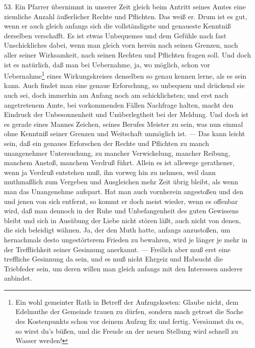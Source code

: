 53. Ein Pfarrer übernimmt in unserer Zeit gleich beim Antritt seines Amtes eine ziemliche Anzahl äußerlicher Rechte und Pflichten. Das weiß er. Drum ist es gut, wenn er auch gleich anfangs sich die vollständigste und genaueste Kenntniß derselben verschafft. Es ist etwas Unbequemes und dem Gefühle nach fast Unschickliches dabei, wenn man gleich vorn herein nach seinen Grenzen, nach aller seiner Wirksamkeit, nach seinen Rechten und Pflichten fragen soll. Und doch ist es natürlich, daß man bei
Uebernahme, ja, wo möglich, schon vor Uebernahme\footnote{Ein wohl gemeinter Rath in Betreff der Aufzugskosten: Glaube nicht, dem Edelmuthe der Gemeinde trauen zu dürfen, sondern mach getrost die Sache des Kostenpunkts schon vor deinem Aufzug fix und fertig. Versäumst du es, so wirst du’s büßen, und die Freude an der neuen Stellung wird schnell zu Wasser werden!} eines Wirkungskreises denselben so genau kennen lerne, als es sein kann. Auch findet man eine genaue Erforschung, so unbequem und drückend sie auch sei, doch immerhin am Anfang noch am schicklichsten; und erst nach angetretenem Amte, bei vorkommenden Fällen Nachfrage halten, macht den Eindruck der Unbesonnenheit und Unüberlegtheit bei der Meldung. Und doch ist es gerade eines Mannes Zeichen, seines Berufes Meister zu sein, was nun einmal ohne Kenntniß seiner Grenzen und Weitschaft unmöglich ist. — Das kann leicht sein, daß ein genaues Erforschen der Rechte und Pflichten zu manch unangenehmer Untersuchung, zu mancher Verwickelung, mancher Reibung, manchem Anstoß, manchem Verdruß führt. Allein es ist allewege gerathener, wenn ja Verdruß entstehen muß, ihn vorweg hin zu nehmen, weil dann muthmaßlich zum Vergeben und Ausgleichen mehr Zeit übrig bleibt, als wenn man das Unangenehme aufspart. Hat man auch vornherein angestoßen und den und jenen von sich entfernt, so kommt er doch meist wieder, wenn es offenbar wird, daß man dennoch in der Ruhe und Unbefangenheit des guten Gewissens bleibt und sich in Ausübung der Liebe nicht stören läßt, auch nicht von denen, die sich beleidigt wähnen. Ja, der den Muth hatte, anfangs anzustoßen, um hernachmals
desto ungestörterem Frieden zu bewahren, wird je länger je mehr in der Trefflichkeit seiner Gesinnung anerkannt. — Freilich aber muß erst eine treffliche Gesinnung da sein, und es muß nicht Ehrgeiz und Habsucht die Triebfeder sein, um deren willen man gleich anfangs mit den Interessen anderer anbindet.

